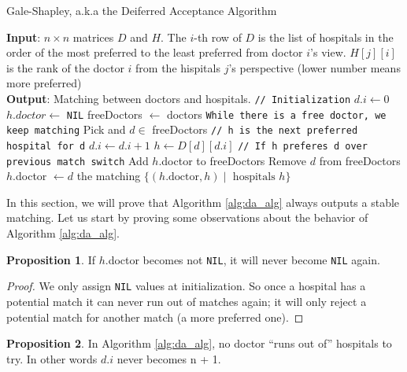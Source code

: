 \documentclass [12pt]{article}
\theoremstyle{definition}
\newtheorem{proposition}{Proposition}
\begin{document}
\begin{algorithm}
\caption{Gale-Shapley, a.k.a the Deiferred Acceptance Algorithm}
\label{alg:da_alg}
\begin{algorithmic}
\State \textbf{Input}: 
 $n \times n$ matrices $D$ and $H$. The $i$-th row of $D$ is the list of hospitals in the order of the most preferred to the least preferred from doctor $i$'s view. $H[j][i]$ is the rank of the doctor $i$ from the hispitals $j$'s perspective (lower number means more preferred) \\
\State \textbf{Output}: Matching between doctors and hospitals.
\State \texttt{// Initialization}
\State {} {
    \State $d.i \gets 0$
}
\State {} {
    \State $h.doctor \gets $ \texttt{NIL}
}
\State freeDoctors $\gets$ doctors
\State \texttt{While there is a free doctor, we keep matching}
\State {} {
    \State Pick and $d \in $ freeDoctors
    \State \texttt{// h is the next preferred hospital for d}
    \State $d.i \gets d.i + 1$
    \State $h \gets D[d][d.i]$ 
    \State \texttt{// If h preferes d over previous match switch}
    \State {} {
        \State Add $h$.doctor to freeDoctors
        \State Remove $d$ from freeDoctors
        \State $h.$doctor $\gets d$
    }
}
\State \Return the matching $\{(h.\text{doctor}, h) \mid \text{ hospitals } h\}$
\end{algorithmic}
\end{algorithm}

In this section, we will prove that Algorithm \ref{alg:da_alg} always outputs a stable matching. Let us start by proving some observations about the behavior of Algorithm \ref{alg:da_alg}. 
\begin{proposition}
If $h$.doctor becomes not \texttt{NIL}, it will never become \texttt{NIL} again.
\end{proposition}

\begin{proof}
We only assign \texttt{NIL} values at initialization. So once a hospital has a potential match it can never run out of matches again; it will only reject a potential match for another match (a more preferred one).
\end{proof}

\begin{proposition} In Algorithm \ref{alg:da_alg}, no doctor ``runs out of'' hospitals to try. In other words $d.i$ never becomes n + 1. 
\end{proposition}
\end{document}
